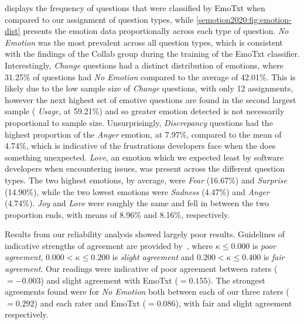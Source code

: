  displays the frequency of questions that were classified by EmoTxt when compared to our assignment of question types, while \cref{semotion2020:fig:emotion-dist} presents the emotion data proportionally across each type of question. \textit{No Emotion} was the most prevalent across all question types, which is consistent with the findings of the Collab group during the training of the EmoTxt classifier. Interestingly, \textit{ Change} questions had a distinct distribution of emotions, where 31.25\% of questions had \textit{No Emotion} compared to the average of 42.01\%. This is likely due to the low sample size of \textit{ Change} questions, with only 12 assignments, however the next highest set of emotive questions are found in the second largest sample (\textit{ Usage}, at 59.21\%) and so greater emotion detected is not necessarily proportional to sample size.  Unsurprisingly, \textit{Discrepancy} questions had the highest proportion of the \textit{Anger} emotion, at 7.97\%, compared to the mean of 4.74\%, which is indicative of the frustrations developers face when the  does something unexpected. \textit{Love}, an emotion which we expected least by software developers when encountering issues, was present across the different question types. The two highest emotions, by average, were \textit{Fear} (16.67\%) and \textit{Surprise} (14.90\%), while the two lowest emotions were \textit{Sadness} (4.47\%) and \textit{Anger} (4.74\%). \textit{Joy} and \textit{Love} were roughly the same and fell in between the two proportion ends, with means of 8.96\% and 8.16\%, respectively.

Results from our reliability analysis showed largely poor results. Guidelines of indicative strengths of agreement are provided by~\citet{Landis:1977kv}, where $\kappa \leq 0.000$ is \textit{poor agreement}, $0.000 < \kappa \leq 0.200$ is \textit{slight agreement} and $0.200 < \kappa \leq 0.400$ is \textit{fair agreement}. Our readings were indicative of poor agreement between raters (\cohen{}$=-0.003$) and slight agreement with EmoTxt (\light{}$=0.155$).  The strongest agreements found were for \textit{No Emotion} both between each of our three raters (\light{}$=0.292$) and each rater and EmoTxt (\cohen{}$=0.086$), with fair and slight agreement respectively.

